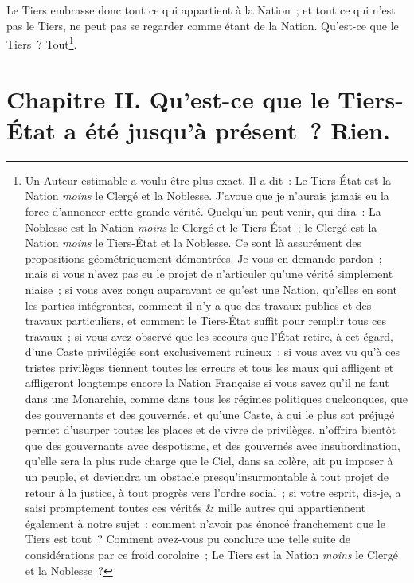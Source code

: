 \documentclass[french,twoside]{book} %
\newcommand\chapteropen{} %
\newcommand\chapterclose{} %
\begin{document}
Le Tiers embrasse donc tout ce qui appartient à la Nation ; et tout ce qui n’est pas le Tiers, ne peut pas se regarder comme étant de la Nation. Qu’est-ce que le Tiers ? Tout\footnote{Un Auteur estimable a voulu être plus exact. Il a dit : Le Tiers-État est la Nation {\itshape moins} le Clergé et la Noblesse. J’avoue que je n’aurais jamais eu la force d’annoncer cette grande vérité. Quelqu’un peut venir, qui dira : La Noblesse est la Nation {\itshape moins} le Clergé et le Tiers-État ; le Clergé est la Nation {\itshape moins} le Tiers-État et la Noblesse. Ce sont là assurément des propositions géométriquement démontrées. Je vous en demande pardon ; mais si vous n’avez pas eu le projet de n’articuler qu’une vérité simplement niaise ; si vous avez conçu auparavant ce qu’est une Nation, qu’elles en sont les parties intégrantes, comment il n’y a que des travaux publics et des travaux particuliers, et comment le Tiers-État suffit pour remplir tous ces travaux ; si vous avez observé que les secours que l’État retire, à cet égard, d’une Caste privilégiée sont exclusivement ruineux ; si vous avez vu qu’à ces tristes privilèges tiennent toutes les erreurs et tous les maux qui affligent et affligeront longtemps encore la Nation Française si vous savez qu’il ne faut dans une Monarchie, comme dans tous les régimes politiques quelconques, que des gouvernants et des gouvernés, et qu’une Caste, à qui le plus sot préjugé permet d’usurper toutes les places et de vivre de privilèges, n’offrira bientôt que des gouvernants avec despotisme, et des gouvernés avec insubordination, qu’elle sera la plus rude charge que le Ciel, dans sa colère, ait pu imposer à un peuple, et deviendra un obstacle presqu’insurmontable à tout projet de retour à la justice, à tout progrès vers l’ordre social ; si votre esprit, dis-je, a saisi promptement toutes ces vérités \& mille autres qui appartiennent également à notre sujet : comment n’avoir pas énoncé franchement que le Tiers est tout ? Comment avez-vous pu conclure une telle suite de considérations par ce froid corolaire ; Le Tiers est la Nation {\itshape moins} le Clergé et la Noblesse ?}.\par

\chapterclose


\chapteropen
\chapter[{Chapitre II. Qu’est-ce que le Tiers-État a été jusqu’à présent ? Rien.}]{Chapitre II. Qu’est-ce que le Tiers-État a été jusqu’à présent ? Rien.}\renewcommand{\leftmark}{Chapitre II. Qu’est-ce que le Tiers-État a été jusqu’à présent ? Rien.}
\end{document}
